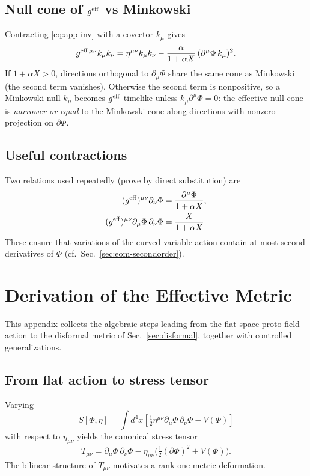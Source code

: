\documentclass{article}
\begin{document}
\subsection{Null cone of \texorpdfstring{$g^{\rm eff}$}{g\^eff} vs Minkowski}
\label{app:nullcone}
Contracting \eqref{eq:app-inv} with a covector $k_\mu$ gives
\begin{equation}
g^{\rm eff\,\mu\nu}k_\mu k_\nu
=\eta^{\mu\nu}k_\mu k_\nu
-\frac{\alpha}{1+\alpha X}\,(\partial^\mu\Phi\,k_\mu)^2.
\label{eq:null-rel}
\end{equation}
If $1+\alpha X>0$, directions orthogonal to $\partial_\mu\Phi$ share the same cone as Minkowski (the second term vanishes). Otherwise the second term is nonpositive, so a Minkowski-null $k_\mu$ becomes $g^{\rm eff}$-timelike unless $k_\mu\partial^\mu\Phi=0$: the effective null cone is \emph{narrower or equal} to the Minkowski cone along directions with nonzero projection on $\partial\Phi$.

\subsection{Useful contractions}
\label{app:ids}
Two relations used repeatedly (prove by direct substitution) are
\begin{align}
(g^{\rm eff})^{\mu\nu}\partial_\nu\Phi &= \frac{\partial^\mu\Phi}{1+\alpha X},
\label{eq:raise-lower-app}\\
(g^{\rm eff})^{\mu\nu}\partial_\mu\Phi\,\partial_\nu\Phi &= \frac{X}{1+\alpha X}.
\label{eq:contract-app}
\end{align}
These ensure that variations of the curved-variable action contain at most second derivatives of $\Phi$ (cf.\ Sec.~\ref{sec:eom-secondorder}).


\section{Derivation of the Effective Metric}
\label{app:metric}

This appendix collects the algebraic steps leading from the flat-space proto-field action to the disformal metric of Sec.~\ref{sec:disformal}, together with controlled generalizations.

\subsection*{From flat action to stress tensor}
Varying 
\begin{equation}
S[\Phi,\eta]=\int d^4x \left[\tfrac12 \eta^{\mu\nu}\partial_\mu\Phi\,\partial_\nu\Phi - V(\Phi)\right]
\end{equation}
with respect to $\eta_{\mu\nu}$ yields the canonical stress tensor
\begin{equation}
T_{\mu\nu}=\partial_\mu\Phi\,\partial_\nu\Phi-\eta_{\mu\nu}\Big(\tfrac12(\partial\Phi)^2+V(\Phi)\Big).
\end{equation}
The bilinear structure of $T_{\mu\nu}$ motivates a rank-one metric deformation.
\end{document}
